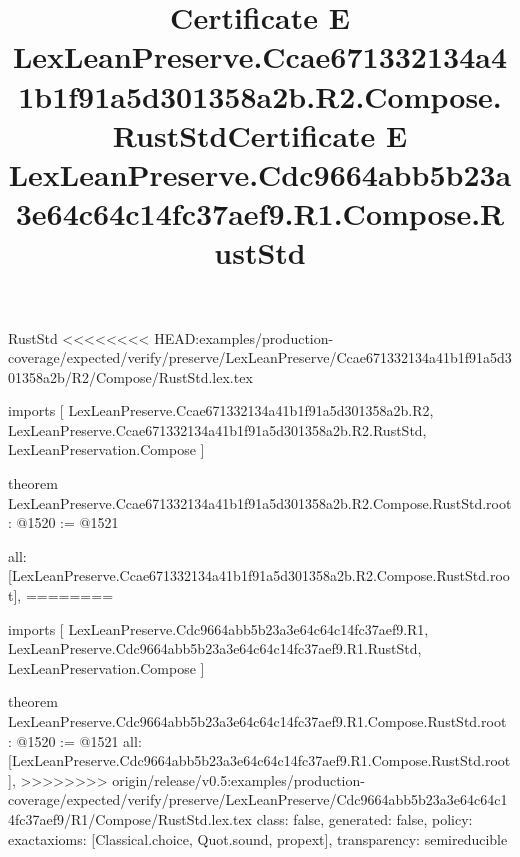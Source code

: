 \begin{lexlean}{RustStd}
<<<<<<<< HEAD:examples/production-coverage/expected/verify/preserve/LexLeanPreserve/Ccae671332134a41b1f91a5d301358a2b/R2/Compose/RustStd.lex.tex
\title{Certificate E LexLeanPreserve.Ccae671332134a41b1f91a5d301358a2b.R2.Compose.RustStd}
\begin{coremodule}
imports [
  LexLeanPreserve.Ccae671332134a41b1f91a5d301358a2b.R2,
  LexLeanPreserve.Ccae671332134a41b1f91a5d301358a2b.R2.RustStd,
  LexLeanPreservation.Compose
]

theorem LexLeanPreserve.Ccae671332134a41b1f91a5d301358a2b.R2.Compose.RustStd.root : @1520 := @1521 {
  all: [LexLeanPreserve.Ccae671332134a41b1f91a5d301358a2b.R2.Compose.RustStd.root],
========
\title{Certificate E LexLeanPreserve.Cdc9664abb5b23a3e64c64c14fc37aef9.R1.Compose.RustStd}
\begin{coremodule}
imports [
  LexLeanPreserve.Cdc9664abb5b23a3e64c64c14fc37aef9.R1,
  LexLeanPreserve.Cdc9664abb5b23a3e64c64c14fc37aef9.R1.RustStd,
  LexLeanPreservation.Compose
]

theorem LexLeanPreserve.Cdc9664abb5b23a3e64c64c14fc37aef9.R1.Compose.RustStd.root : @1520 := @1521 {
  all: [LexLeanPreserve.Cdc9664abb5b23a3e64c64c14fc37aef9.R1.Compose.RustStd.root],
>>>>>>>> origin/release/v0.5:examples/production-coverage/expected/verify/preserve/LexLeanPreserve/Cdc9664abb5b23a3e64c64c14fc37aef9/R1/Compose/RustStd.lex.tex
  class: false,
  generated: false,
  policy: exact{axioms: [Classical.choice, Quot.sound, propext]},
  transparency: semireducible
}


\end{coremodule}}
\end{coremodule}
\end{lexlean}
